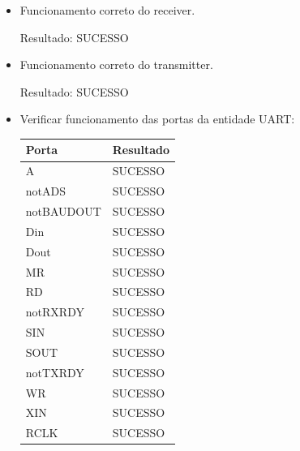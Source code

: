 \documentclass[12pt, a4paper]{article}
\begin{document}
	\begin{itemize}
		\item Funcionamento correto do receiver.
		\par Resultado: SUCESSO
		
		\item Funcionamento correto do transmitter.
		\par Resultado: SUCESSO
		
		\item Verificar funcionamento das portas da entidade UART:
		\begin{table}[H]
			\begin{center}
				\begin{tabular}{|l|l|}
					\hline
					Porta      & Resultado \\ \hline
					A          & SUCESSO          \\ \hline
					notADS     & SUCESSO          \\ \hline
					notBAUDOUT & SUCESSO          \\ \hline
					Din        & SUCESSO          \\ \hline
					Dout       & SUCESSO          \\ \hline
					MR         & SUCESSO          \\ \hline
					RD         & SUCESSO          \\ \hline
					notRXRDY   & SUCESSO          \\ \hline
					SIN        & SUCESSO          \\ \hline
					SOUT       & SUCESSO          \\ \hline
					notTXRDY   & SUCESSO          \\ \hline
					WR         & SUCESSO          \\ \hline
					XIN        & SUCESSO         \\ \hline
					RCLK       & SUCESSO          \\ \hline
				\end{tabular}
			\end{center}
		\end{table}
		
		
	\end{itemize}
	
	
\end{document}
